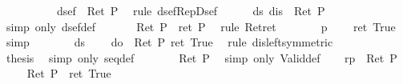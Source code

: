 \begin{isabellebody}
\ \ \isamarkupfalse%
\ {\isacharminus}\isanewline
\ \ \ \ \isamarkupfalse%
\ {\isachardoublequote}dsef\ {\isacharparenleft}{\isasymDown}\ {\isacharparenleft}Ret\ P{\isacharparenright}{\isacharparenright}{\isachardoublequote}\ \isamarkupfalse%
\ {\isacharparenleft}rule\ dsef{\isacharunderscore}Rep{\isacharunderscore}Dsef{\isacharparenright}\isanewline
\ \ \ \ \isamarkupfalse%
\ ds{\isacharcolon}\ {\isachardoublequote}dis\ {\isacharparenleft}{\isasymDown}\ {\isacharparenleft}Ret\ P{\isacharparenright}{\isacharparenright}{\isachardoublequote}\ \isamarkupfalse%
\ {\isacharparenleft}simp\ only{\isacharcolon}\ dsef{\isacharunderscore}def{\isacharparenright}\isanewline
\ \ \ \ \isamarkupfalse%
\ {\isachardoublequote}{\isasymDown}\ {\isacharparenleft}Ret\ P{\isacharparenright}\ {\isacharequal}\ ret\ P{\isachardoublequote}\ \isamarkupfalse%
\ {\isacharparenleft}rule\ Ret{\isacharunderscore}ret{\isacharparenright}\isanewline
\ \ \ \ \isamarkupfalse%
\ \isamarkupfalse%
\ p\ \isamarkupfalse%
\ {\isachardoublequote}{\isasymdots}\ {\isacharequal}\ ret\ True{\isachardoublequote}\ \isamarkupfalse%
\ simp\isanewline
\ \ \ \ \isamarkupfalse%
\ \isamarkupfalse%
\ ds\ \isamarkupfalse%
\ {\isachardoublequote}{\isasymdots}\ {\isacharequal}\ do\ {\isacharbraceleft}{\isasymDown}\ {\isacharparenleft}Ret\ P{\isacharparenright}{\isacharsemicolon}\ ret\ True{\isacharbraceright}{\isachardoublequote}\ \isamarkupfalse%
\ {\isacharparenleft}rule\ dis{\isacharunderscore}left{\isacharbrackleft}symmetric{\isacharbrackright}{\isacharparenright}\isanewline
\ \ \ \ \isamarkupfalse%
\ \isamarkupfalse%
\ {\isacharquery}thesis\ \isamarkupfalse%
\ {\isacharparenleft}simp\ only{\isacharcolon}\ seq{\isacharunderscore}def{\isacharparenright}\isanewline
\ \ \isamarkupfalse%
\isanewline
\ \ \isamarkupfalse%
\ {\isachardoublequote}{\isasymturnstile}\ Ret\ P{\isachardoublequote}\ \isamarkupfalse%
\ {\isacharparenleft}simp\ only{\isacharcolon}\ Valid{\isacharunderscore}def{\isacharparenright}\isanewline
\isamarkupfalse%
\isanewline
\ \ \isamarkupfalse%
\ rp{\isacharcolon}\ {\isachardoublequote}{\isasymturnstile}\ Ret\ P{\isachardoublequote}\isanewline
\ \ \isamarkupfalse%
\ {\isachardoublequote}{\isasymDown}\ {\isacharparenleft}Ret\ P{\isacharparenright}\ {\isacharequal}\ ret\ True{\isachardoublequote}\ \isamarkupfalse%

\end{isabellebody}
